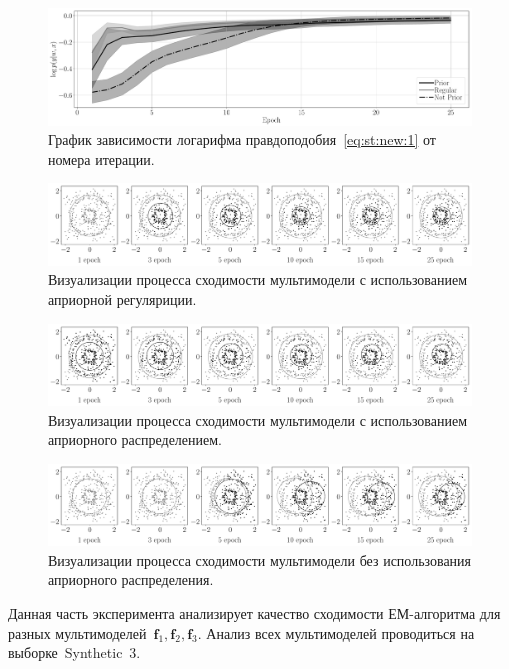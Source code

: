 \begin{figure}[h!t]\center
\includegraphics[width=1\textwidth]{results/priorexpert/experiment_synt_likelihood_progress}
\caption{График зависимости логарифма правдоподобия~\eqref{eq:st:new:1} от номера итерации.}
\label{experiment:st:2:2}
\end{figure}

\begin{figure}[h!t]\center
\includegraphics[width=1\textwidth]{results/priorexpert/experiment_synt_regular_progress}
\caption{Визуализации процесса сходимости мультимодели с использованием априорной регуляриции.}
\label{experiment:st:2:3}
\end{figure}

\begin{figure}[h!t]\center
\includegraphics[width=1\textwidth]{results/priorexpert/experiment_synt_prior_progress}
\caption{Визуализации процесса сходимости мультимодели с использованием априорного распределением.}
\label{experiment:st:2:4}
\end{figure}

\begin{figure}[h!t]\center
\includegraphics[width=1\textwidth]{results/priorexpert/experiment_synt_not_prior_progress}
\caption{Визуализации процесса сходимости мультимодели без использования априорного распределения.}
\label{experiment:st:2:5}
\end{figure}
Данная часть эксперимента анализирует качество сходимости ЕМ-алгоритма для разных мультимоделей~$\textbf{f}_1, \textbf{f}_2, \textbf{f}_3$.
Анализ всех мультимоделей проводиться на выборке~Synthetic~3.

